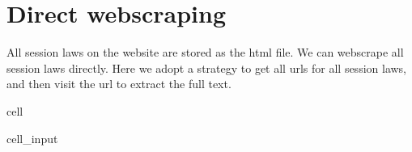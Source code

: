 \documentclass[letterpaper,10pt,english]{jupyterBook}
\begin{document}
\section{Direct webscraping}
\label{\detokenize{ch36:direct-webscraping}}
\sphinxAtStartPar
All session laws on the website are stored as the html file. We can webscrape all session laws directly. Here we adopt a strategy to get all urls for all session laws, and then visit the url to extract the full text.

\begin{sphinxuseclass}{cell}\begin{sphinxVerbatimInput}

\begin{sphinxuseclass}{cell_input}
\begin{sphinxVerbatim}[commandchars=\\\{\}]
  


\end{sphinxVerbatim}
\end{sphinxuseclass}
\end{sphinxVerbatimInput}
\end{sphinxuseclass}
\end{document}

